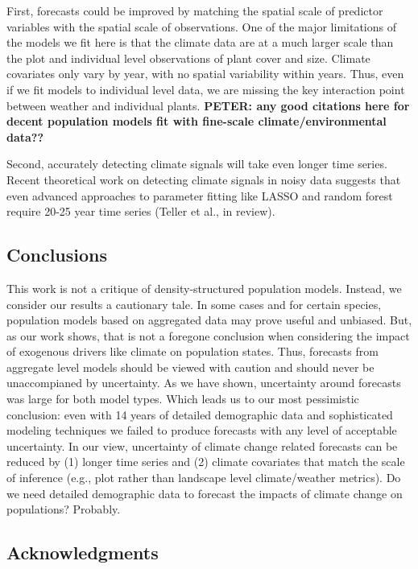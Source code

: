 \documentclass[12pt,]{article}
\begin{document}
First, forecasts could be improved by matching the spatial scale of
predictor variables with the spatial scale of observations. One of the
major limitations of the models we fit here is that the climate data are
at a much larger scale than the plot and individual level observations
of plant cover and size. Climate covariates only vary by year, with no
spatial variability within years. Thus, even if we fit models to
individual level data, we are missing the key interaction point between
weather and individual plants. \textbf{PETER: any good citations here
for decent population models fit with fine-scale climate/environmental
data??}

Second, accurately detecting climate signals will take even longer time
series. Recent theoretical work on detecting climate signals in noisy
data suggests that even advanced approaches to parameter fitting like
LASSO and random forest require 20-25 year time series (Teller et al.,
in review).

\subsection{Conclusions}\label{conclusions}

This work is not a critique of density-structured population models.
Instead, we consider our results a cautionary tale. In some cases and
for certain species, population models based on aggregated data may
prove useful and unbiased. But, as our work shows, that is not a
foregone conclusion when considering the impact of exogenous drivers
like climate on population states. Thus, forecasts from aggregate level
models should be viewed with caution and should never be unaccompianed
by uncertainty. As we have shown, uncertainty around forecasts was large
for both model types. Which leads us to our most pessimistic conclusion:
even with 14 years of detailed demographic data and sophisticated
modeling techniques we failed to produce forecasts with any level of
acceptable uncertainty. In our view, uncertainty of climate change
related forecasts can be reduced by (1) longer time series and (2)
climate covariates that match the scale of inference (e.g., plot rather
than landscape level climate/weather metrics). Do we need detailed
demographic data to forecast the impacts of climate change on
populations? Probably.

\subsection{Acknowledgments}\label{acknowledgments}
\end{document}
